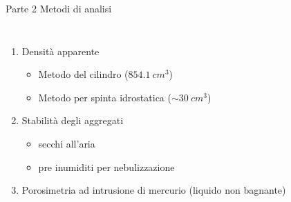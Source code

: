 \documentclass[xcolor={usenames, table, x11names}, final, 10pt]{beamer}
\begin{document}
\begin{frame}{Parte 2 \small{Metodi di analisi}}
  \begin{columns}[T]
    \begin{enumerate}
    \item<1->Densità  apparente
      \begin{itemize}
      \item<2-> Metodo del cilindro ($854.1\: cm^3$)
      \item<4-> Metodo per spinta idrostatica ($\sim 30 \: cm^3$)
      \end{itemize}
    \item<6-> Stabilità degli aggregati
      \begin{itemize}
      \item<7-> secchi all'aria
      \item<7-> pre inumiditi per nebulizzazione
      \end{itemize}
    \item<8-> Porosimetria ad intrusione di mercurio (liquido non bagnante)      
    \end{enumerate}
    \begin{overlayarea}{\textwidth}{0.7\textheight}
\end{overlayarea}
\end{columns}
\end{frame}
\end{document}
